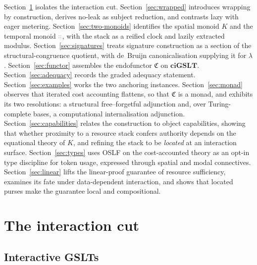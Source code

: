 \documentclass[11pt]{article}
\theoremstyle{definition}
\theoremstyle{plain}
\newcommand{\ciGSLT}{\mathbf{ciGSLT}}
\newcommand{\dec}[1]{\textcolor{costgray}{#1}}   %
\newcommand{\Cost}{\mathfrak{C}}              %
\newcommand{\cons}{\mathbin{\dec{\dblcolon}}}  %
\begin{document}
Section~\ref{sec:metered-cut} isolates the interaction cut.
Section~\ref{sec:wrapped} introduces wrapping by construction, derives
no-leak as subject reduction, and contrasts lazy with eager metering.
Section~\ref{sec:two-monoids} identifies the spatial monoid $K$ and the
temporal monoid $\cons$, with the stack as a reified clock and lazily
extracted modulus. Section~\ref{sec:signatures} treats signature
construction as a section of the structural-congruence quotient, with
de~Bruijn canonicalisation supplying it for $\lambda$.
Section~\ref{sec:functor} assembles the endofunctor $\Cost$ on $\ciGSLT$.
Section~\ref{sec:adequacy} records the graded adequacy statement.
Section~\ref{sec:examples} works the two anchoring instances.
Section~\ref{sec:monad} observes that iterated cost accounting flattens,
so that $\Cost$ is a monad, and exhibits its two resolutions: a
structural free--forgetful adjunction and, over Turing-complete bases, a
computational internalisation adjunction. Section~\ref{sec:capabilities}
relates the construction to object capabilities, showing that whether
proximity to a resource stack confers authority depends on the
equational theory of $K$, and refining the stack to be \emph{located} at
an interaction surface. Section~\ref{sec:types} uses OSLF on the
cost-accounted theory as an opt-in type discipline for token usage,
expressed through spatial and modal connectives.
Section~\ref{sec:linear} lifts the linear-proof guarantee of resource
sufficiency, examines its fate under data-dependent interaction, and
shows that located purses make the guarantee local and compositional.

\section{The interaction cut}
\label{sec:metered-cut}

\subsection{Interactive GSLTs}
\end{document}
